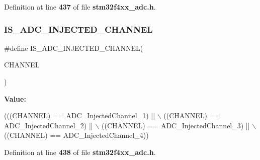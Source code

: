 Definition at line \textbf{ 437} of file \textbf{ stm32f4xx\+\_\+adc.\+h}.

\mbox{\label{group__ADC__injected__channel__selection_gae0bbfb5dbad0fbac8b672db6f63cf8d0}} 
\subsubsection{I\+S\+\_\+\+A\+D\+C\+\_\+\+I\+N\+J\+E\+C\+T\+E\+D\+\_\+\+C\+H\+A\+N\+N\+EL}
{\footnotesize\ttfamily \#define I\+S\+\_\+\+A\+D\+C\+\_\+\+I\+N\+J\+E\+C\+T\+E\+D\+\_\+\+C\+H\+A\+N\+N\+EL(\begin{DoxyParamCaption}\item[{}]{C\+H\+A\+N\+N\+EL }\end{DoxyParamCaption})}

{\bfseries Value\+:}
\begin{DoxyCode}
(((CHANNEL) == ADC_InjectedChannel_1) || \(\backslash\)
                                          ((CHANNEL) == ADC_InjectedChannel_2) || \(\backslash\)
                                          ((CHANNEL) == ADC_InjectedChannel_3) || \(\backslash\)
                                          ((CHANNEL) == ADC_InjectedChannel_4))
\end{DoxyCode}


Definition at line \textbf{ 438} of file \textbf{ stm32f4xx\+\_\+adc.\+h}.

